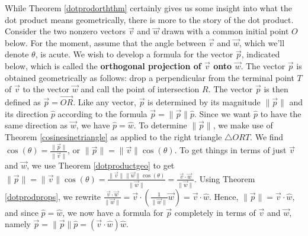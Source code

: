 While Theorem \ref{dotprodorththm} certainly gives us some insight into what the dot product means geometrically, there is more to the story of the dot product.  Consider the two nonzero vectors $\vec{v}$ and $\vec{w}$ drawn with a common initial point $O$  below.  For the moment, assume that the angle between $\vec{v}$ and $\vec{w}$, which we'll denote $\theta$, is acute.  We wish to develop a formula for the vector $\vec{p}$, indicated  below, which is called the \textbf{orthogonal projection of $\vec{v}$ onto $\vec{w}$}.  The vector $\vec{p}$ is obtained geometrically as follows:  drop a perpendicular from the terminal point $T$ of $\vec{v}$ to the vector $\vec{w}$ and call the point of intersection $R$.  The vector $\vec{p}$ is then defined as $\vec{p} = \overrightarrow{OR}$.   Like any vector, $\vec{p}$ is determined by its magnitude $\| \vec{p} \|$ and its direction $\hat{p}$ according to the formula $\vec{p} = \| \vec{p} \| \hat{p}$.  Since we want $\hat{p}$ to have the same direction as $\vec{w}$, we have $\hat{p} = \hat{w}$.  To determine $\| \vec{p} \|$, we make use of Theorem \ref{cosinesinetriangle} as applied to the right triangle $\triangle ORT$.  We find $\cos(\theta) = \frac{\| \vec{p} \|}{\| \vec{v} \|}$, or $\| \vec{p} \| = \| \vec{v} \| \cos(\theta)$.  To get things in terms of just $\vec{v}$ and $\vec{w}$, we use Theorem \ref{dotproductgeo} to get  $\| \vec{p} \| = \| \vec{v} \| \cos(\theta) = \frac{ \| \vec{v} \| \| \vec{w} \| \cos(\theta)}{\| \vec{w} \|} = \frac{\vec{v} \cdot \vec{w}}{\|\vec{w}\|}$. Using Theorem \ref{dotprodprops}, we rewrite  $\frac{\vec{v} \cdot \vec{w}}{\|\vec{w}\|} = \vec{v} \cdot \left(\frac{1}{\|\vec{w}\|} \vec{w}\right) = \vec{v} \cdot \hat{w}$. Hence, $\| \vec{p} \| = \vec{v} \cdot \hat{w}$, and since $\hat{p} = \hat{w}$, we now have a formula for $\vec{p}$ completely in terms of $\vec{v}$ and $\vec{w}$, namely $\vec{p} = \| \vec{p} \| \hat{p} = (\vec{v} \cdot \hat{w}) \hat{w}$.

